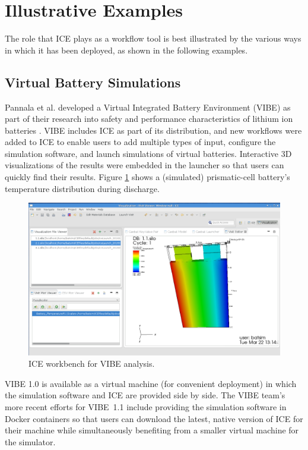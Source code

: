 \section{Illustrative Examples}\label{illustrative-examples}

The role that ICE plays as a workflow tool is best illustrated by the
various ways in which it has been deployed, as shown in the following 
examples.

\subsection{Virtual Battery
Simulations}\label{virtual-battery-simulations}

Pannala et al. developed a Virtual Integrated Battery Environment (VIBE)
as part of their research into safety and performance characteristics of
lithium ion batteries \cite{pannala_multiscale_2015}. VIBE includes ICE
as part of its distribution, and new workflows were added to ICE to enable users
to add multiple types of input, configure the simulation software, and launch
simulations of virtual batteries. Interactive 3D visualizations of the
results were embedded in the launcher so that users can quickly find
their results. Figure \ref{vibe} shows a (simulated) prismatic-cell battery's temperature
distribution during discharge.

\begin{figure}[htbp]
\centering
\includegraphics[width=\textwidth]{images/vibe_20151016.png}
\caption{ICE workbench for VIBE analysis.}
\label{vibe}
\end{figure}

VIBE 1.0 is available as a virtual machine (for convenient deployment) in which the simulation
software and ICE are provided side by side. The VIBE team's more recent 
efforts for VIBE~1.1 include providing the simulation
software in Docker containers so that users can download the latest,
native version of ICE for their machine while simultaneously benefiting
from a smaller virtual machine for the simulator.

